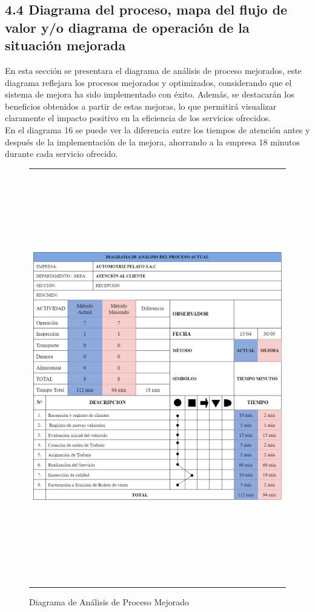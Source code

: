 \subsection{4.4 Diagrama del proceso, mapa del flujo de valor y/o diagrama de operación de la situación mejorada}
En esta sección se presentara el diagrama de análisis de proceso mejorados, este diagrama reflejara los procesos mejorados y optimizados, considerando que el sistema de mejora ha sido implementado con éxito. Además, se destacarán los beneficios obtenidos a partir de estas mejoras, lo que permitirá visualizar claramente el impacto positivo en la eficiencia de los servicios ofrecidos.\\
En el diagrama 16 se puede ver la diferencia entre los tiempos de atención antes y después de la implementación de la mejora, ahorrando a la empresa 18 minutos durante cada servicio ofrecido.

\begin{figure}[H]
    \caption{Diagrama de Análisis de Proceso Mejorado}
    \begin{tabular}{c}
        \includegraphics[width=16cm, height=18cm]{imagenes/cap4/DAPmejoradov2.drawio.png}
    \end{tabular}
    \label{fig:DAPMejorado}
\end{figure}


